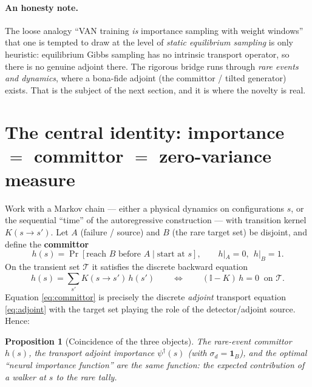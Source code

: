 \documentclass[11pt]{article}
\newcommand{\dg}{^{\dagger}}
\newtheorem{prop}{Proposition}
\begin{document}
\paragraph{An honesty note.} The loose analogy ``VAN training \emph{is} importance sampling
with weight windows'' that one is tempted to draw at the level of \emph{static equilibrium
sampling} is only heuristic: equilibrium Gibbs sampling has no intrinsic transport operator,
so there is no genuine adjoint there. The rigorous bridge runs through \emph{rare events and
dynamics}, where a bona-fide adjoint (the committor / tilted generator) exists. That is the
subject of the next section, and it is where the novelty is real.

\section{The central identity: importance $=$ committor $=$ zero-variance measure}
\label{sec:identity}
Work with a Markov chain --- either a physical dynamics on configurations $s$, or the
sequential ``time'' of the autoregressive construction --- with transition kernel
$K(s\to s')$. Let $A$ (failure / source) and $B$ (the rare target set) be disjoint, and
define the \textbf{committor}
\begin{equation}
h(s)=\Pr[\text{reach }B\text{ before }A\mid \text{start at }s],\qquad h|_A=0,\ \ h|_B=1 .
\end{equation}
On the transient set $\mathcal T$ it satisfies the discrete backward equation
\begin{equation}
h(s)=\sum_{s'}K(s\to s')\,h(s')\qquad\Longleftrightarrow\qquad (\mathbb I-K)\,h=0 \ \text{ on } \mathcal T .
\label{eq:committor}
\end{equation}
Equation \eqref{eq:committor} is precisely the discrete \emph{adjoint} transport equation
\eqref{eq:adjoint} with the target set playing the role of the detector/adjoint source.
Hence:

\begin{prop}[Coincidence of the three objects]
The rare-event committor $h(s)$, the transport adjoint importance $\psi\dg(s)$ (with
$\sigma_d=\mathbf 1_B$), and the optimal ``neural importance function'' are the same
function: the expected contribution of a walker at $s$ to the rare tally.
\end{prop}
\end{document}
